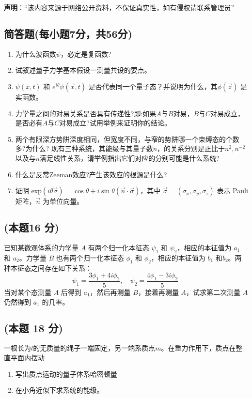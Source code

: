 
\textbf{声明}：“该内容来源于网络公开资料，不保证真实性，如有侵权请联系管理员”

\subsection{简答题(每小题7分，共56分)}
\begin{enumerate}
\item 为什么波函数$\psi$，必定是复函数?
\item 试叙述量子力学基本假设一测量共设的要点。
\item $\psi(x,t)$ 和 $e^{i\theta}\psi(\vec x,t)$ 是否代表同一个量子态？并说明为什么，其$\phi(\vec z)$ 是实函数。
\item 力学量之间的对易关系是否具有传递性?即:如果$A$与$B$对易，$B$与$C$对易成立，是否必有$A$与$C$对易成立?试用举例来证明你的结论。
\item 两个有限深方势阱深度相同，但宽度不同，与窄的势阱哪一个束缚态的个数多?为什么?
现有三种系统，其能级与其量子数$n$，的关系分别是正比于$n^2,n^{-2}$以及与$n$满足线性关系，请举例指出它们对应的分别可能是什么系统?
\item 什么是反常Zeeman效应?产生该效应的根源是什么?
\item 证明 $\text{exp}(i\theta \vec{\sigma}) = \cos \theta + i \sin \theta (\vec{n} \cdot \vec{\sigma})$，其中 $\vec{\sigma} = (\sigma_x, \sigma_y, \sigma_z)$ 表示 Pauli 矩阵，$\vec{n}$ 为单位向量。
\end{enumerate}
\subsection{(本题16 分)}
已知某微观体系的力学量 $A$ 有两个归一化本征态 $\psi_1$ 和 $\psi_2$，相应的本征值为 $a_1$ 和 $a_2$。力学量 $B$ 也有两个归一化本征态 $\phi_1$ 和 $\phi_2$，相应的本征值为 $b_1$ 和$b_2$。两种本征态之间存在如下关系：
$$\psi_1 = \frac{3\phi_1 + 4i\phi_2}{5}, \quad \psi_2 = \frac{4\phi_1 - 3i\phi_2}{5}~$$
当对某个态测量 $A$ 后得到 $a_1$，然后再测量 $B$，接着再测量 $A$，试求第二次测量 $A$ 仍然得到 $a_1$ 的几率。
\subsection{(本题 18 分)}
一根长为$l$的无质量的绳子一端固定，另一端系质点$m$。在重力作用下，质点在整直平面内摆动
\begin{enumerate}
\item 写出质点运动的量子体系哈密顿量
\item 在小角近似下求系统的能级。
\end{enumerate}
